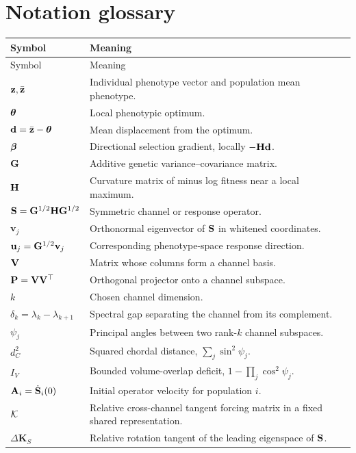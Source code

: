 \appendix

\chapter{Notation glossary}

\begin{longtable}{@{}p{}p{}@{}}
\toprule
Symbol & Meaning \\
\midrule
\endfirsthead
\toprule
Symbol & Meaning \\
\midrule
\endhead
\(\mathbf z,\bar{\mathbf z}\) & Individual phenotype vector and population mean phenotype. \\
\(\boldsymbol{\theta}\) & Local phenotypic optimum. \\
\(\mathbf d=\bar{\mathbf z}-\boldsymbol{\theta}\) & Mean displacement from the optimum. \\
\(\boldsymbol{\beta}\) & Directional selection gradient, locally \(-\mathbf{H}\mathbf d\). \\
\(\mathbf{G}\) & Additive genetic variance--covariance matrix. \\
\(\mathbf{H}\) & Curvature matrix of minus log fitness near a local maximum. \\
\(\mathbf{S}=\mathbf{G}^{1/2}\mathbf{H}\mathbf{G}^{1/2}\) & Symmetric channel or response operator. \\
\(\mathbf v_j\) & Orthonormal eigenvector of \(\mathbf{S}\) in whitened coordinates. \\
\(\mathbf u_j=\mathbf{G}^{1/2}\mathbf v_j\) & Corresponding phenotype-space response direction. \\
\(\mathbf{V}\) & Matrix whose columns form a channel basis. \\
\(\mathbf{P}=\mathbf{V}\mathbf{V}^\top\) & Orthogonal projector onto a channel subspace. \\
\(k\) & Chosen channel dimension. \\
\(\delta_k=\lambda_k-\lambda_{k+1}\) & Spectral gap separating the channel from its complement. \\
\(\psi_j\) & Principal angles between two rank-\(k\) channel subspaces. \\
\(d_C^2\) & Squared chordal distance, \(\sum_j\sin^2\psi_j\). \\
\(I_V\) & Bounded volume-overlap deficit, \(1-\prod_j\cos^2\psi_j\). \\
\(\mathbf{A}_i=\dot{\mathbf{S}}_i(0)\) & Initial operator velocity for population \(i\). \\
\(\mathcal K\) & Relative cross-channel tangent forcing matrix in a fixed shared representation. \\
\(\Delta\mathbf K_S\) & Relative rotation tangent of the leading eigenspace of \(\mathbf{S}\). \\

\end{longtable}
